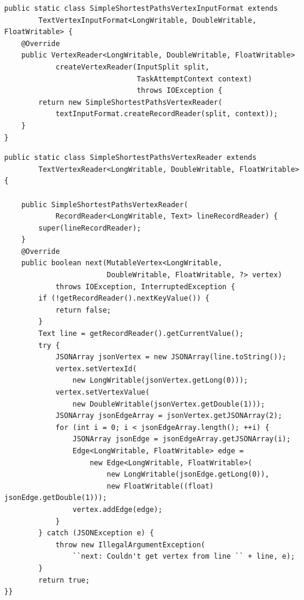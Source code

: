 \begin{lstlisting}[float]
public static class SimpleShortestPathsVertexInputFormat extends
        TextVertexInputFormat<LongWritable, DoubleWritable, FloatWritable> {
    @Override
    public VertexReader<LongWritable, DoubleWritable, FloatWritable>
            createVertexReader(InputSplit split,
                               TaskAttemptContext context)
                               throws IOException {
        return new SimpleShortestPathsVertexReader(
            textInputFormat.createRecordReader(split, context));
    }
}
\end{lstlisting}

\begin{lstlisting}[float]
public static class SimpleShortestPathsVertexReader extends
        TextVertexReader<LongWritable, DoubleWritable, FloatWritable> {

    public SimpleShortestPathsVertexReader(
            RecordReader<LongWritable, Text> lineRecordReader) {
        super(lineRecordReader);
    }
    @Override
    public boolean next(MutableVertex<LongWritable,
                        DoubleWritable, FloatWritable, ?> vertex)
            throws IOException, InterruptedException {
        if (!getRecordReader().nextKeyValue()) {
            return false;
        }
        Text line = getRecordReader().getCurrentValue();
        try {
            JSONArray jsonVertex = new JSONArray(line.toString());
            vertex.setVertexId(
                new LongWritable(jsonVertex.getLong(0)));
            vertex.setVertexValue(
                new DoubleWritable(jsonVertex.getDouble(1)));
            JSONArray jsonEdgeArray = jsonVertex.getJSONArray(2);
            for (int i = 0; i < jsonEdgeArray.length(); ++i) {
                JSONArray jsonEdge = jsonEdgeArray.getJSONArray(i);
                Edge<LongWritable, FloatWritable> edge =
                    new Edge<LongWritable, FloatWritable>(
                        new LongWritable(jsonEdge.getLong(0)),
                        new FloatWritable((float) jsonEdge.getDouble(1)));
                vertex.addEdge(edge);
            }
        } catch (JSONException e) {
            throw new IllegalArgumentException(
                ``next: Couldn't get vertex from line `` + line, e);
        }
        return true;
}}
\end{lstlisting}

